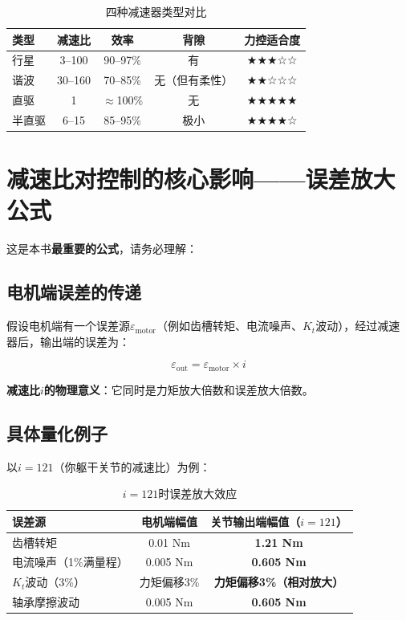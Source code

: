 \begin{table}[H]
\centering
\begin{tabular}{lcccc}
\toprule
\textbf{类型} & \textbf{减速比} & \textbf{效率} & \textbf{背隙} & \textbf{力控适合度} \\
\midrule
行星 & 3--100 & 90--97\% & 有 & ★★★☆☆ \\
谐波 & 30--160 & 70--85\% & 无（但有柔性） & ★★☆☆☆ \\
直驱 & 1 & $\approx$100\% & 无 & ★★★★★ \\
半直驱 & 6--15 & 85--95\% & 极小 & ★★★★☆ \\
\bottomrule
\end{tabular}
\caption{四种减速器类型对比}
\label{tab:gearbox_types}
\end{table}

\section{减速比对控制的核心影响——误差放大公式}

这是本书\textbf{最重要的公式}，请务必理解：

\subsection{电机端误差的传递}

假设电机端有一个误差源$\varepsilon_{\text{motor}}$（例如齿槽转矩、电流噪声、$K_t$波动），经过减速器后，输出端的误差为：

\begin{equation}
\varepsilon_{\text{out}} = \varepsilon_{\text{motor}} \times i
\end{equation}

\textbf{减速比$i$的物理意义}：它同时是力矩放大倍数和误差放大倍数。

\subsection{具体量化例子}

以$i=121$（你躯干关节的减速比）为例：

\begin{table}[H]
\centering
\begin{tabular}{lcc}
\toprule
\textbf{误差源} & \textbf{电机端幅值} & \textbf{关节输出端幅值（$i=121$）} \\
\midrule
齿槽转矩 & 0.01 Nm & \textbf{1.21 Nm} \\
电流噪声（1\%满量程） & 0.005 Nm & \textbf{0.605 Nm} \\
$K_t$波动（3\%） & 力矩偏移3\% & \textbf{力矩偏移3\%（相对放大）} \\
轴承摩擦波动 & 0.005 Nm & \textbf{0.605 Nm} \\
\bottomrule
\end{tabular}
\caption{$i=121$时误差放大效应}
\label{tab:error_amplification}
\end{table}

